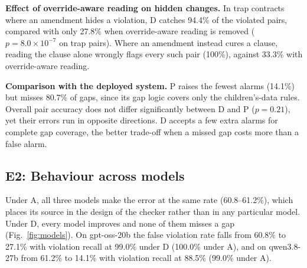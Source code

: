 \documentclass[conference]{IEEEtran}
\begin{document}
\textbf{Effect of override-aware reading on hidden changes.} In trap contracts where an amendment hides a violation, D catches 94.4\% of the violated pairs, compared with only 27.8\% when override-aware reading is removed ($p=8.0\times10^{-7}$ on trap pairs). Where an amendment instead cures a clause, reading the clause alone wrongly flags every such pair (100\%), against 33.3\% with override-aware reading.

\textbf{Comparison with the deployed system.} P raises the fewest alarms (14.1\%) but misses 80.7\% of gaps, since its gap logic covers only the children's-data rules. Overall pair accuracy does not differ significantly between D and P ($p=0.21$), yet their errors run in opposite directions. D accepts a few extra alarms for complete gap coverage, the better trade-off when a missed gap costs more than a false alarm.

\subsection{E2: Behaviour across models}

Under A, all three models make the error at the same rate (60.8--61.2\%), which places its source in the design of the checker rather than in any particular model. Under D, every model improves and none of them misses a gap (Fig.~\ref{fig:models}). On gpt-oss-20b the false violation rate falls from 60.8\% to 27.1\% with violation recall at 99.0\% under D (100.0\% under A), and on qwen3.8-27b from 61.2\% to 14.1\% with violation recall at 88.5\% (99.0\% under A).
\end{document}
